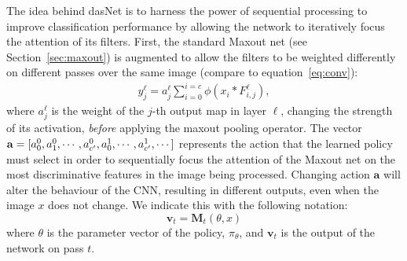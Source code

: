 The idea behind dasNet is to harness the power of sequential
processing to improve classification performance by allowing the
network to iteratively focus the attention of its filters.  First, the
standard Maxout net (see Section~\ref{sec:maxout}) is augmented to
allow the filters to be weighted differently on different passes over
the same image (compare to equation~\ref{eq:conv}):
\begin{align}
\label{eq:gconv}
y_j^\ell = a_j^\ell\sum_{i=0}^{i=c}\phi (x_i \ast F_{i,j}^\ell),
\end{align}
\noindent
where $a_{j}^\ell$ is the weight of the $j$-th output map in layer
$\ell$, changing the strength of its activation, \emph{before}
applying the maxout pooling operator.  The vector ${\mathbf a}=[a^0_0,
a^0_1, \cdots, a^0_{c'},\\ a^1_0, \cdots, a^1_{c'}, \cdots]$ represents
the action that the learned policy must select in order to
sequentially focus the attention of the Maxout net on the most
discriminative features in the image being processed.
Changing action $\mathbf{a}$ will alter the behaviour of the CNN,
resulting in different outputs, even when the image $x$ does not
change.  We indicate this with the following notation:
\begin{equation}
\mathbf{v}_t = \mathbf{M}_t(\theta, x)
\end{equation}
\noindent where $\theta$ is the parameter vector of the policy,
$\pi_\theta$, and $\mathbf{v}_t$ is the output of the network on pass $t$.

